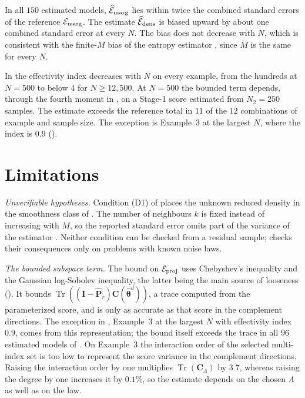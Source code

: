 \documentclass[review,hidelinks,onefignum,onetabnum]{siamart251216}
\newcommand{\tr}{\operatorname{Tr}}
\newcommand{\mC}{\bm{C}}
\newcommand{\hmP}{\widehat{\bm{P}}}
\newcommand{\mI}{\bm{I}}
\newcommand{\whvtheta}{\widehat{\bm{\theta}}^{d}}
\begin{document}
In all $150$ estimated models, $\widehat{\mathcal E}_{\rm marg}$ lies within twice the combined standard errors of the reference $\mathcal E_{\rm marg}$. The estimate $\widehat{\mathcal E}_{\rm dens}$ is biased upward by about one combined standard error at every $N$. The bias does not decrease with $N$, which is consistent with the finite-$M$ bias of the entropy estimator \cite[Cor.~4]{BerrettSamworthYuan2019}, since $M$ is the same for every $N$.

In  the effectivity index decreases with $N$ on every example, from the hundreds at $N = 500$ to below $4$ for $N \ge 12{,}500$. At $N = 500$ the bounded term depends, through the fourth moment in , on a Stage-1 score estimated from $N_2 = 250$ samples. The estimate exceeds the reference total in $11$ of the $12$ combinations of example and sample size. The exception is Example~3 at the largest $N$, where the index is $0.9$ ().

\section{Limitations}
\label{sec:limitations}


\emph{Unverifiable hypotheses.} Condition \textup{(D1)} of  places the unknown reduced density in the smoothness class of \cite{BerrettSamworthYuan2019}. The number of neighbours $k$ is fixed instead of increasing with $M$, so the reported standard error omits part of the variance of the estimator \cite[\S3.4]{BerrettSamworthYuan2019}. Neither condition can be checked from a residual sample;  checks their consequences only on problems with known noise laws.

\emph{The bounded subspace term.} The bound on $\mathcal E_{\rm proj}$ uses Chebyshev's inequality and the Gaussian log-Sobolev inequality, the latter being the main source of looseness (). It bounds $\tr((\mI-\hmP_r)\mC(\whvtheta))$, a trace computed from the parameterized score, and is only as accurate as that score in the complement directions. The exception in , Example~3 at the largest $N$ with effectivity index $0.9$, comes from this representation; the bound itself exceeds the trace in all $96$ estimated models of . On Example~3 the interaction order of the selected multi-index set is too low to represent the score variance in the complement directions. Raising the interaction order by one multiplies $\tr(\mC_\Lambda)$ by $3.7$, whereas raising the degree by one increases it by $0.1\%$, so the estimate depends on the chosen $\Lambda$ as well as on the law.
\end{document}
